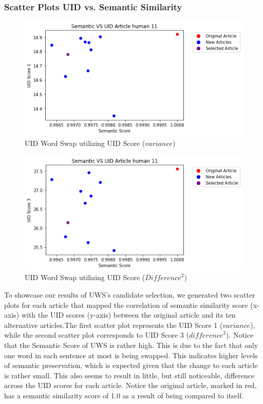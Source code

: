 \documentclass{article}
\begin{document}
\subsubsection*{Scatter Plots UID vs. Semantic Similarity}
\begin{figure}[H]
    \centering
    \includegraphics[width=1\linewidth]{UIDWordArticle11UID1.png}
    \caption{UID Word Swap utilizing UID Score ($variance$)}
    \label{UWS Figure}
\end{figure}
\begin{figure}[H]
    \centering
    \includegraphics[width=1\linewidth]{UIDWordArticle11UID3.png}
    \caption{UID Word Swap utilizing UID Score (${Difference}^2$)}
    \label{UWS Figure 2}
\end{figure}

To showcase our results of UWS's candidate selection, we generated two scatter plots for each article that mapped the correlation of semantic similarity score (x-axis) with the UID scores (y-axis) between the original article and its ten alternative articles.The first scatter plot represents the UID Score 1 ($variance$), while the second scatter plot corresponds to UID Score 3 (${difference}^2$).
Notice that the Semantic Score of UWS is rather high. This is due to the fact that only one word in each sentence at most is being swapped. This indicates higher levels of semantic preservation, which is expected given that the change to each article is rather small. This also seems to result in little, but still noticeable, difference across the UID scores for each article. Notice the original article, marked in red, has a semantic similarity score of 1.0 as a result of being compared to itself.
\end{document}

